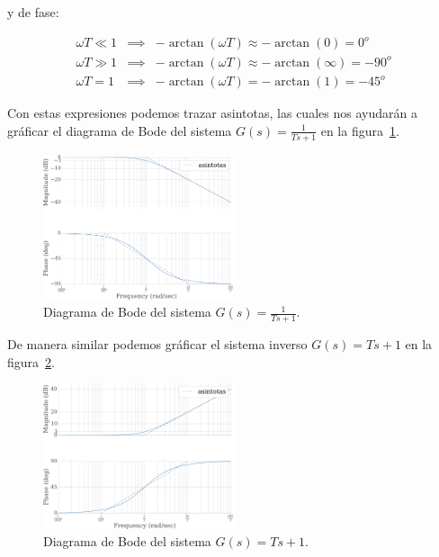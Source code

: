         y de fase:

        \begin{eqnarray*}
            \omega T \ll 1 & \implies & -\arctan{(\omega T)} \approx - \arctan{(0)} = 0^o \\
            \omega T \gg 1 & \implies & -\arctan{(\omega T)} \approx - \arctan{(\infty)} = -90^o \\
            \omega T = 1 & \implies & -\arctan{(\omega T)} = - \arctan{(1)} = -45^o
        \end{eqnarray*}

        Con estas expresiones podemos trazar asintotas,  las cuales nos ayudarán a gráficar el diagrama de Bode del sistema $G(s) = \frac{1}{Ts + 1}$ en la figura~\ref{fig:bodeprimerorden}.

        \begin{figure}
            \centering
            \includegraphics[width=0.5\textwidth]{./imagenes/bodeprimerorden.pdf}
            \caption{\label{fig:bodeprimerorden}Diagrama de Bode del sistema $G(s) = \frac{1}{Ts + 1}$.}
        \end{figure}

        De manera similar podemos gráficar el sistema inverso $G(s) =Ts + 1$ en la figura~\ref{fig:bodeprimerordeninverso}.

        \begin{figure}
            \centering
            \includegraphics[width=0.5\textwidth]{./imagenes/bodeprimerordeninverso.pdf}
            \caption{\label{fig:bodeprimerordeninverso}Diagrama de Bode del sistema $G(s) = Ts + 1$.}
        \end{figure}

